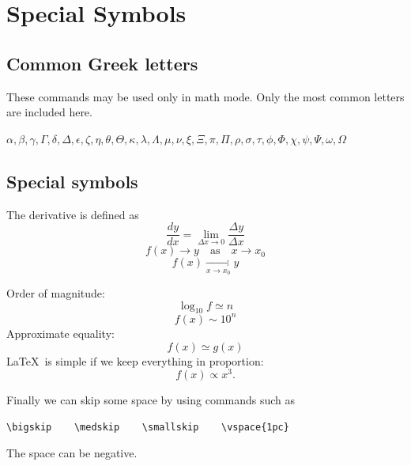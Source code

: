 \documentclass[12pt]{article}
\begin{document}
\section{Special Symbols}

\subsection{Common Greek letters}

These commands may be used only in math mode. Only the most common
letters are included here.

$\alpha,\beta,\gamma,\Gamma,\delta,\Delta,\epsilon,\zeta,\eta,\theta,\Theta,\kappa,\lambda,\Lambda,\mu,\nu,\xi,\Xi,\pi,\Pi,\rho,\sigma,\tau,\phi,\Phi,\chi,\psi,\Psi,\omega,\Omega$

\subsection{Special symbols}

The derivative is defined as
\begin{equation}
\frac{dy}{dx} = \lim_{\Delta x \to 0} \frac{\Delta y}{\Delta x}
\end{equation}
\begin{equation}
f(x) \to y \quad \mbox{as} \quad x \to x_{0}
\end{equation}
\begin{equation}
f(x) \mathop {\longrightarrow} \limits_{x \to x_0} y
\end{equation}

\noindent Order of magnitude:
\begin{equation}
\log_{10}f \simeq n
\end{equation}
\begin{equation}
f(x) \sim 10^{n}
\end{equation}
Approximate equality:
\begin{equation}
f(x) \simeq g(x)
\end{equation}
\LaTeX\ is simple if we keep everything in proportion:
\begin{equation}
f(x) \propto x^3 .
\end{equation}

Finally we can skip some space by using commands such as
\begin{verbatim}
\bigskip    \medskip    \smallskip    \vspace{1pc}
\end{verbatim}
The space can be negative.
\end{document}
